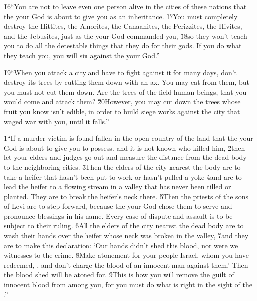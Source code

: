 \v{16}``You are not to leave even one person alive in the cities of these nations that the  your God is about to give you as an inheritance. \v{17}You must completely destroy the Hittites, the Amorites, the Canaanites, the Perizzites, the Hivites, and the Jebusites, just as the  your God commanded you, \v{18}so they won't teach you to do all the detestable things that they do for their gods. If you do what they teach you, you will sin against the  your God.''

\v{19}``When you attack a city and have to fight against it for many days, don't destroy its trees by cutting them down with an ax. You may eat from them, but you must not cut them down. Are the trees of the field human beings, that you would come and attack them? \v{20}However, you may cut down the trees whose fruit you know isn't edible, in order to build siege works against the city that waged war with you, until it falls.''

\v{1}``If a murder victim is found fallen in the open country of the land that the  your God is about to give you to possess, and it is not known who killed him, \v{2}then let your elders and judges go out and measure the distance from the dead body to the neighboring cities. \v{3}Then the elders of the city nearest the body are to take a heifer that hasn't been put to work or hasn't pulled a yoke \v{4}and are to lead the heifer to a flowing stream in a valley that has never been tilled or planted. They are to break the heifer's neck there. \v{5}Then the priests of the sons of Levi are to step forward, because the  your God chose them to serve and pronounce blessings in his name. Every case of dispute and assault is to be subject to their ruling. \v{6}All the elders of the city nearest the dead body are to wash their hands over the heifer whose neck was broken in the valley, \v{7}and they are to make this declaration: `Our hands didn't shed this blood, nor were we witnesses to the crime. \v{8}Make atonement for your people Israel, whom you have redeemed, , and don't charge the blood of an innocent man against them.' Then the blood shed will be atoned for. \v{9}This is how you will remove the guilt of innocent blood from among you, for you must do what is right in the sight of the .''

